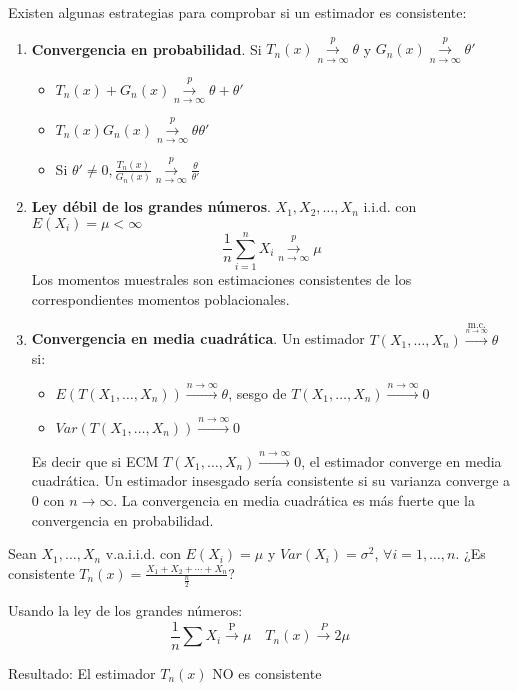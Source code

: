Existen algunas estrategias para comprobar si un estimador es consistente:
\begin{enumerate}
    \item \textbf{Convergencia en probabilidad}. Si $T_n(x) \overset{p}{\underset{n \to \infty}{\to}} \theta$ y $G_n(x) \overset{p}{\underset{n \to \infty}{\to}} \theta'$
          \begin{itemize}
              \item $T_n(x)+G_n(x) \overset{p}{\underset{n \to \infty}{\to}} \theta + \theta '$
              \item $T_n(x)G_n(x) \overset{p}{\underset{n \to \infty}{\to}} \theta\theta '$
              \item Si $\theta' \neq 0, \frac{T_n(x)}{G_n(x)} \overset{p}{\underset{n \to \infty}{\to}} \frac{\theta}{\theta '}$
          \end{itemize}

    \item \textbf{Ley débil de los grandes números}. $X_1, X_2, \dots, X_n$ i.i.d. con $E(X_i)=\mu < \infty$
          \[\frac{1}{n}\sum_{i=1}^{n} X_i \overset{p}{\underset{n \to \infty}{\to}} \mu\]
          Los momentos muestrales son estimaciones consistentes de los correspondientes momentos poblacionales.

    \item \textbf{Convergencia en media cuadrática}. Un estimador $T(X_1, \dots, X_n)\xrightarrow{\underset{n \to \infty}{\text{m.c.}}} \theta$ si:
          \begin{itemize}
              \item $E(T(X_1, \dots, X_n)) \xrightarrow{{n \to \infty}} \theta$, sesgo de $T(X_1, \dots, X_n)\xrightarrow{{n \to \infty}} 0$
              \item $Var(T(X_1, \dots, X_n)) \xrightarrow{{n \to \infty}} 0$
          \end{itemize}
          Es decir que si ECM $T(X_1, \dots, X_n) \xrightarrow{{n \to \infty}} 0$, el estimador converge en media cuadrática. Un estimador insesgado sería consistente si su varianza converge a 0 con $n \to \infty$. La convergencia en media cuadrática es más fuerte que la convergencia en probabilidad.
\end{enumerate}

\begin{exercise}
    Sean $X_1, \dots, X_n$ v.a.i.i.d. con $E(X_i)=\mu$ y $Var(X_i)=\sigma^2$, $\forall i=1, \dots, n$. ¿Es consistente $T_n(x) = \frac{X_1 + X_2 + \dotsb + X_n}{\frac{n}{2}}$?

    Usando la ley de los grandes números:
    \[
        \frac{1}{n}\sum X_i \xrightarrow{\text{P}} \mu \quad T_n(x)\xrightarrow{P}2\mu
    \]

    Resultado: El estimador $T_n(x)$ NO es consistente
\end{exercise}

